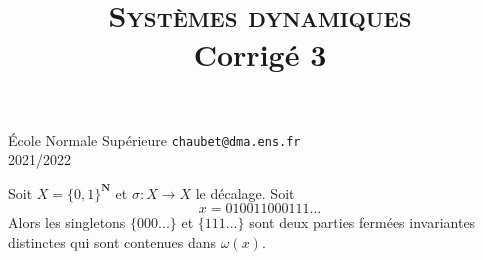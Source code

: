 \documentclass[a4paper,12pt,openany]{article}
\title{\textsc{Syst\`emes dynamiques} \\Corrig\'e 3}
\date{}
\author{}
\theoremstyle{plain}
\theoremstyle{definition}
\newcommand{\N}{\mathbf{N}}
\begin{document}
{\noindent \'Ecole Normale Sup\'erieure  \hfill \texttt{chaubet@dma.ens.fr}} \\
{2021/2022 \hfill}

{\let\newpage\relax\maketitle}
\maketitle

 \vspace{1.5mm} 

\noindent Soit $X = \{0, 1\}^\N$ et $\sigma : X \to X$ le d\'ecalage. Soit
$$
x = 010011000111...
$$
Alors les singletons $\{000...\}$ et $\{111...\}$ sont deux parties ferm\'ees invariantes distinctes qui sont contenues dans $\omega(x)$.
\vspace{0.6cm}

 \vspace{1.5mm} 
\end{document}
